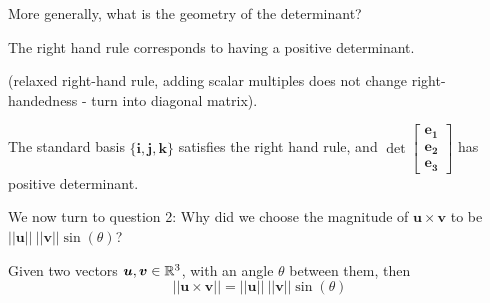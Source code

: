 More generally, what is the geometry of the determinant?

    \begin{proposition}
        The right hand rule corresponds to having a positive determinant.
    \end{proposition}

 (relaxed right-hand rule, adding scalar multiples does not change right-handedness - turn into diagonal matrix).

\begin{example}
    The standard basis $\{\bm{i}, \bm{j}, \bm{k}\}$ satisfies the right hand rule, and $\det\begin{bmatrix}
\bm{e_1}\\
    \bm{e_2}  \\
    \bm{e_3}
\end{bmatrix}$ has positive determinant.
\end{example}


We now turn to question 2: Why did we choose the  magnitude of $\bm{u \times v}$ to be $||\bm{u}|| \ ||\bm{v}|| \sin(\theta)$?

\begin{proposition}\label{crossprodmagnitudeexp}
        Given two vectors $\bm{u}, \bm{v} \in \mathbb{R}^3$, with an angle $\theta$ between them, then $$||\bm{u \times v}|| = ||\bm{u}|| \ ||\bm{v}|| \sin(\theta)$$
    \end{proposition}
    
